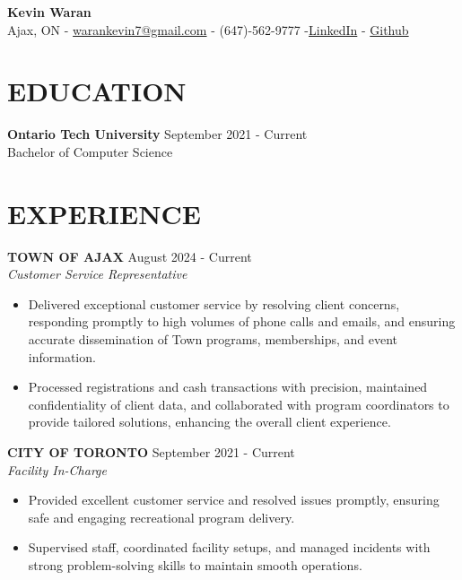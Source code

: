 \documentclass[11pt]{article}
\begin{document}
\begin{center}
    \textbf{\Large Kevin Waran} \\
    Ajax, ON - \href{mailto:warankevin7@gmail.com}{warankevin7@gmail.com} -  (647)-562-9777 -\href{https://www.linkedin.com/in/kevin-waran-16aa75267}{LinkedIn}  - \href{https://github.com/kevin-waran} {Github}
\end{center}

\vspace{0.5em}

\section*{EDUCATION}
\textbf{Ontario Tech University} \hfill September 2021 - Current \\
Bachelor of Computer Science

\section*{EXPERIENCE}

\textbf{TOWN OF AJAX} \hfill August 2024 - Current \\
\textit{Customer Service Representative}
\begin{itemize}[leftmargin=*, itemsep=2pt]
    \item Delivered exceptional customer service by resolving client concerns, responding promptly to high volumes of phone calls and emails, and ensuring accurate dissemination of Town programs, memberships, and event information.
    \item Processed registrations and cash transactions with precision, maintained confidentiality of client data, and collaborated with program coordinators to provide tailored solutions, enhancing the overall client experience.
\end{itemize}

\textbf{CITY OF TORONTO} \hfill September 2021 - Current \\
\textit{Facility In-Charge}
\begin{itemize}[leftmargin=*, itemsep=2pt]
    \item Provided excellent customer service and resolved issues promptly, ensuring safe and engaging recreational program delivery.
    \item Supervised staff, coordinated facility setups, and managed incidents with strong problem-solving skills to maintain smooth operations.
\end{itemize}
\end{document}
